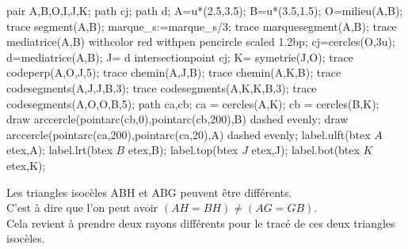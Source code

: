 \begin{changemargin}{0mm}{-15mm}
\begin{remarque}
    \begin{minipage}{0.4\linewidth}
    \begin{center}
        \begin{Geometrie}[CoinHD={(6u,5u)}]    
            pair A,B,O,I,J,K;
            path cj;
            path d;
            A=u*(2.5,3.5);
            B=u*(3.5,1.5);
            O=milieu(A,B);
            trace segment(A,B);
            marque_s:=marque_s/3;
            trace marquesegment(A,B);
            trace mediatrice(A,B) withcolor red withpen pencircle scaled 1.2bp;
            cj=cercles(O,3u);
            d=mediatrice(A,B);
            J= d intersectionpoint cj;
            K= symetrie(J,O);
            trace codeperp(A,O,J,5);
            trace chemin(A,J,B);
            trace chemin(A,K,B);
            trace codesegments(A,J,J,B,3);
            trace codesegments(A,K,K,B,3);
            trace codesegments(A,O,O,B,5);
            path ca,cb;
            ca = cercles(A,K);
            cb = cercles(B,K);
            draw arccercle(pointarc(cb,0),pointarc(cb,200),B) dashed evenly;
            draw arccercle(pointarc(ca,200),pointarc(ca,20),A) dashed evenly;
            label.ulft(btex $A$ etex,A);
            label.lrt(btex $B$ etex,B);
            label.top(btex $J$ etex,J);
            label.bot(btex $K$ etex,K);
        \end{Geometrie}
    \end{center}
    \end{minipage}
    \begin{minipage}{0.6\linewidth}
    Les triangles isocèles ABH et ABG peuvent être différents.\\
    C'est à dire que l'on peut avoir $(AH=BH) \neq (AG=GB)$.\\
    Cela revient à prendre deux rayons différents pour le tracé de ces deux triangles isocèles.
    \end{minipage}
\end{remarque}
\end{changemargin}

\begin{center}
    \begin{myBox}{}
        \begin{flushleft}        

            \smallskip
        \end{flushleft}
    
        \creditInstrumentPoche
    \end{myBox}
\end{center}
